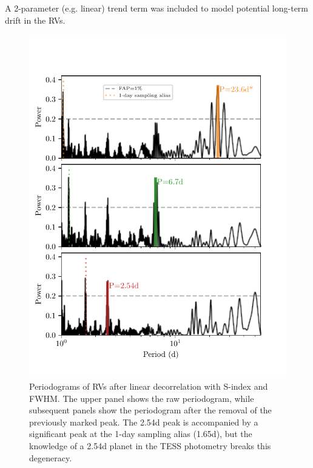 \documentclass[fleqn,usenatbib]{mnras}
\newcommand{\TSindexperiod}{ $ 39.0 \pm 11.0 $ }
\begin{document}
A 2-parameter (e.g. linear) trend term was included to model potential long-term drift in the RVs.

\begin{figure}
	\includegraphics[width=\columnwidth]{TOI755_decorrelation_periodograms}
    \caption{Periodograms of RVs after linear decorrelation with S-index and FWHM. The upper panel shows the raw periodogram, while subsequent panels show the periodogram after the removal of the previously marked peak. The 2.54d peak is accompanied by a significant peak at the 1-day sampling alias (1.65d), but the knowledge of a 2.54d planet in the TESS photometry breaks this degeneracy.}
    \label{fig:rv_decorr}
\end{figure}
\end{document}
